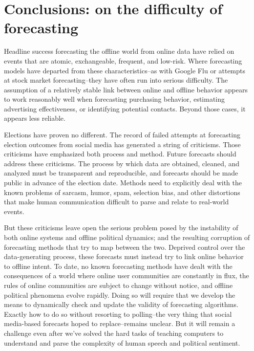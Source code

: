 \documentclass{article}
\begin{document}
\section{Conclusions: on the difficulty of forecasting}
\label{sec:concl-diff-forec}

Headline success forecasting the offline world from online data have
relied on events that are atomic, exchangeable, frequent, and
low-risk. Where forecasting models have departed from these
characteristics--as with Google Flu or attempts at stock market
forecasting--they have often run into serious difficulty. The
assumption of a relatively stable link between online and offline
behavior appears to work reasonably well when forecasting purchasing
behavior, estimating advertising effectiveness, or identifying
potential contacts. Beyond those cases, it appears less reliable.

Elections have proven no different. The record of failed attempts at
forecasting election outcomes from social media has generated a string
of criticisms. Those criticisms have emphasized both process and
method. Future forecasts should address these criticisms. The process
by which data are obtained, cleaned, and analyzed must be transparent
and reproducible, and forecasts should be made public in advance of
the election date. Methods need to explicitly deal with the known
problems of sarcasm, humor, spam, selection bias, and other
distortions that make human communication difficult to parse and
relate to real-world events. 

But these criticisms leave open the serious problem posed by the
instability of both online systems and offline political dynamics; and
the resulting corruption of forecasting methods that try to map
between the two. Deprived control over the data-generating process,
these forecasts must instead try to link online behavior to offline
intent. To date, no known forecasting methods have dealt with the
consequences of a world where online user communities are constantly
in flux, the rules of online communities are subject to change without
notice, and offline political phenomena evolve rapidly. Doing so will
require that we develop the means to dynamically check and update the
validity of forecasting algorithms. Exactly how to do so without
resorting to polling--the very thing that social media-based forecasts
hoped to replace--remains unclear. But it will remain a challenge even
after we've solved the hard tasks of teaching computers to understand
and parse the complexity of human speech and political sentiment.
\end{document}

